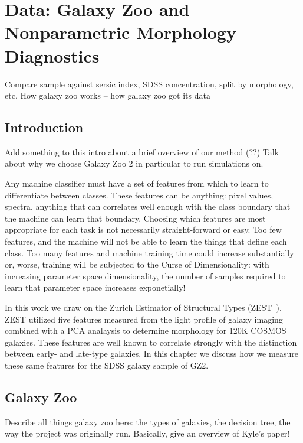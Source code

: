 
\chapter{Data: Galaxy Zoo and Nonparametric Morphology Diagnostics}
\label{chap:2}


Compare sample against sersic index, SDSS concentration, split by morphology, etc. 
How galaxy zoo works -- how galaxy zoo got its data

\section{Introduction}
Add something to this intro about a brief overview of our method (??) Talk about why we choose Galaxy Zoo 2 in particular to run simulations on. 

Any machine classifier must have a set of features from which to learn to differentiate between classes. These features can be anything: pixel values, spectra, anything that can correlates well enough with the class boundary that the machine can learn that boundary. Choosing which features are most appropriate for each task is not necessarily straight-forward or easy. Too few features, and the machine will not be able to learn the things that define each class. Too many features and machine training time could increase substantially or, worse, training will be subjected to the Curse of Dimensionality: with increasing parameter space dimensionality, the number of samples required to learn that parameter space increases exponetially! 

In this work we draw on the Zurich Estimator of Structural Types (ZEST~\citep{Scarlata2007}). ZEST utilized five features measured from the light profile of galaxy imaging combined with a PCA analaysis to determine morphology for 120K COSMOS galaxies. These features are well known to correlate strongly with the distinction between early- and late-type galaxies. In this chapter we discuss how we measure these same features for the SDSS galaxy sample of GZ2. 


\section{Galaxy Zoo}
Describe all things galaxy zoo here: the types of galaxies, the decision tree, the way the project was originally run. Basically, give an overview of Kyle's paper! 


